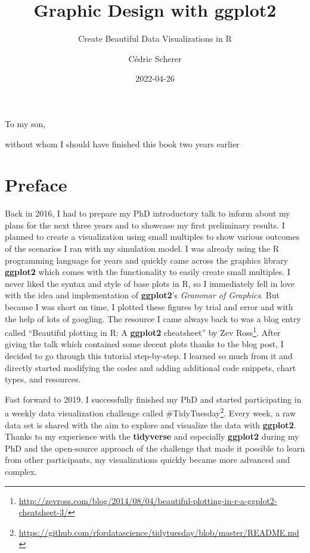 \documentclass[
]{krantz}
\title{Graphic Design with ggplot2}
\subtitle{Create Beautiful Data Visualizations in R}
\author{Cédric Scherer}
\date{2022-04-26}
\renewcommand{\href}[2]{#2\footnote{\url{#1}}}
\begin{document}
\maketitle


\thispagestyle{empty}

\begin{center}
To my son,

without whom I should have finished this book two years earlier
\end{center}

\setlength{\abovedisplayskip}{-5pt}
\setlength{\abovedisplayshortskip}{-5pt}

{
\hypersetup{linkcolor=}
\setcounter{tocdepth}{2}
\tableofcontents
}
\listoffigures
\listoftables
\hypertarget{preface}{%
\chapter*{Preface}\label{preface}}


Back in 2016, I had to prepare my PhD introductory talk to inform about my plans for the next three years and to showcase my first preliminary results. I planned to create a visualization using small multiples to show various outcomes of the scenarios I ran with my simulation model. I was already using the R programming language for years and quickly came across the graphics library \textbf{ggplot2} which comes with the functionality to easily create small multiples. I never liked the syntax and style of base plots in R, so I immediately fell in love with the idea and implementation of \textbf{ggplot2}'s \emph{Grammar of Graphics}. But because I was short on time, I plotted these figures by trial and error and with the help of lots of googling. The resource I came always back to was a blog entry called \href{http://zevross.com/blog/2014/08/04/beautiful-plotting-in-r-a-ggplot2-cheatsheet-3/}{``Beautiful plotting in R: A \textbf{ggplot2} cheatsheet'' by Zev Ross}. After giving the talk which contained some decent plots thanks to the blog post, I decided to go through this tutorial step-by-step. I learned so much from it and directly started modifying the codes and adding additional code snippets, chart types, and resources.

Fast forward to 2019. I successfully finished my PhD and started participating in a weekly data visualization challenge called \href{https://github.com/rfordatascience/tidytuesday/blob/master/README.md}{\#TidyTuesday}. Every week, a raw data set is shared with the aim to explore and visualize the data with \textbf{ggplot2}. Thanks to my experience with the \textbf{tidyverse} and especially \textbf{ggplot2} during my PhD and the open-source approach of the challenge that made it possible to learn from other participants, my visualizations quickly became more advanced and complex.
\end{document}
